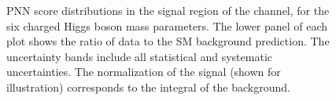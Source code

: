 \begin{figure}
		  \caption{\label{fig:taujets_SR_PNNscores_body} \gls{PNN} score distributions in the
		signal region of the \taujets channel, for the six charged Higgs boson mass parameters.
		The lower panel of each plot shows the ratio of data to the \acrshort{SM} background prediction. The uncertainty bands include all statistical and systematic uncertainties. 
		The normalization of the signal (shown for illustration) corresponds to the integral of the background.}
		\end{figure}

